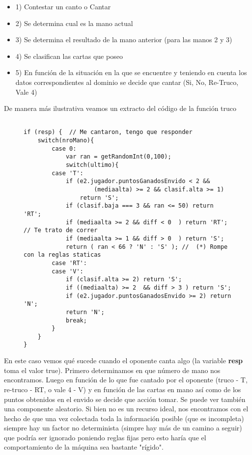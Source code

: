 \documentclass[12pt,a4paper]{article}
\begin{document}
\begin{itemize}
\item 1) Contestar un canto o Cantar
\item 2) Se determina cual es la mano actual
\item 3) Se determina el resultado de la mano anterior (para las manos 2 y 3)
\item 4) Se clasifican las cartas que poseo
\item 5) En función de la situación en la que se encuentre y teniendo en cuenta los datos correspondientes al dominio
	   se decide que cantar (Si, No, Re-Truco, Vale 4)
\end{itemize}

De manera m\'as ilustrativa veamos un extracto del c\'odigo de la funci\'on truco
\begin{figure}[h]
\lstset{language=java,caption=Extracto de la funci\'on truco,label=lst:nicecode}
\begin{lstlisting}

if (resp) {  // Me cantaron, tengo que responder
	switch(nroMano){
		case 0:
			var ran = getRandomInt(0,100);
			switch(ultimo){
		case 'T':
			if (e2.jugador.puntosGanadosEnvido < 2 && 
					(mediaalta) >= 2 && clasif.alta >= 1)
				return 'S';
			if (clasif.baja === 3 && ran <= 50) return 'RT'; 
			if (mediaalta >= 2 && diff < 0  ) return 'RT';  // Te trato de correr
			if (mediaalta >= 1 && diff > 0  ) return 'S';
			return ( ran < 66 ? 'N' : 'S' ); //  (*) Rompe con la reglas staticas
		case 'RT':
		case 'V':
			if (clasif.alta >= 2) return 'S';
			if ((mediaalta) >= 2  && diff > 3 ) return 'S';
			if (e2.jugador.puntosGanadosEnvido >= 2) return 'N';
			return 'N';
			break;
		}
	}
}
\end{lstlisting}
\end{figure}


\noindent En este caso vemos qu\'e sucede cuando el oponente canta algo (la variable \textbf{resp} toma el valor true). Primero determinamos
en que n\'umero de mano nos encontramos. Luego en funci\'on de lo que fue cantado por el oponente (truco - T, re-truco - RT, o vale 4 - V)
y en funci\'on de las cartas en mano as\'i como de los puntos obtenidos en el envido se decide que acci\'on tomar. Se puede ver tambi\'en
una componente aleatorio. Si bien no es un recurso ideal, nos encontramos con el hecho de que una vez colectada toda la informaci\'on posible
(que es incompleta) siempre hay un factor no determinista (simpre hay m\'as de un camino a seguir)
que podr\'ia ser ignorado poniendo reglas fijas pero esto har\'ia que el comportamiento de la m\'aquina sea bastante "r\'igido".
\end{document}
